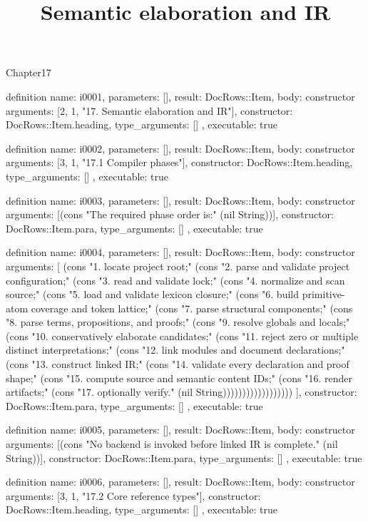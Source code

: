 \begin{lexlean}{Chapter17}
\title{Semantic elaboration and IR}
\begin{semanticmodule}
definition{
  name: i0001,
  parameters: [],
  result: DocRows::Item,
  body: constructor{
    arguments: [2, 1, "17. Semantic elaboration and IR"],
    constructor: DocRows::Item.heading,
    type_arguments: []
  },
  executable: true
}

definition{
  name: i0002,
  parameters: [],
  result: DocRows::Item,
  body: constructor{
    arguments: [3, 1, "17.1 Compiler phases"],
    constructor: DocRows::Item.heading,
    type_arguments: []
  },
  executable: true
}

definition{
  name: i0003,
  parameters: [],
  result: DocRows::Item,
  body: constructor{
    arguments: [(cons "The required phase order is:" (nil String))],
    constructor: DocRows::Item.para,
    type_arguments: []
  },
  executable: true
}

definition{
  name: i0004,
  parameters: [],
  result: DocRows::Item,
  body: constructor{
    arguments: [
      (cons "1. locate project root;" (cons "2. parse and validate project configuration;" (cons "3. read and validate lock;" (cons "4. normalize and scan source;" (cons "5. load and validate lexicon closure;" (cons "6. build primitive-atom coverage and token lattice;" (cons "7. parse structural components;" (cons "8. parse terms, propositions, and proofs;" (cons "9. resolve globals and locals;" (cons "10. conservatively elaborate candidates;" (cons "11. reject zero or multiple distinct interpretations;" (cons "12. link modules and document declarations;" (cons "13. construct linked IR;" (cons "14. validate every declaration and proof shape;" (cons "15. compute source and semantic content IDs;" (cons "16. render artifacts;" (cons "17. optionally verify." (nil String))))))))))))))))))
    ],
    constructor: DocRows::Item.para,
    type_arguments: []
  },
  executable: true
}

definition{
  name: i0005,
  parameters: [],
  result: DocRows::Item,
  body: constructor{
    arguments: [(cons "No backend is invoked before linked IR is complete." (nil String))],
    constructor: DocRows::Item.para,
    type_arguments: []
  },
  executable: true
}

definition{
  name: i0006,
  parameters: [],
  result: DocRows::Item,
  body: constructor{
    arguments: [3, 1, "17.2 Core reference types"],
    constructor: DocRows::Item.heading,
    type_arguments: []
  },
  executable: true
}


\end{semanticmodule}
\end{lexlean}
